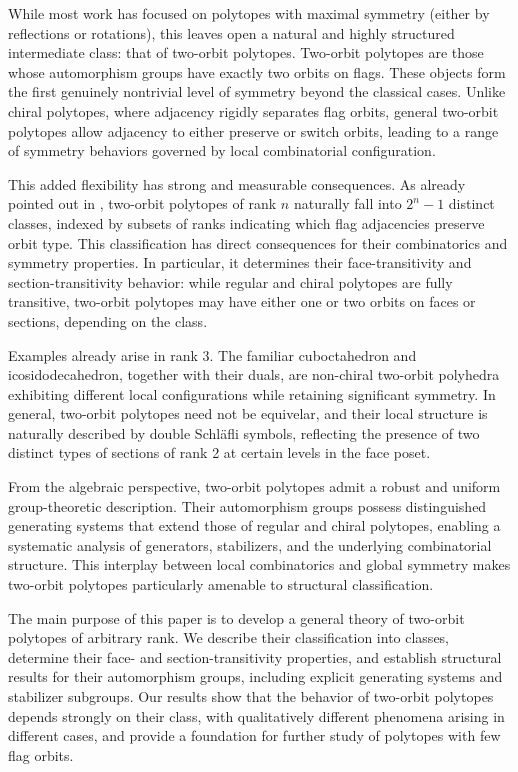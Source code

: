 \documentclass[12pt]{article}
\renewcommand{\>}{\rangle}
\theoremstyle{definition}\newtheorem{definition}{Definition}[section]
\begin{document}
While most work has focused on polytopes with maximal symmetry (either by reflections or rotations), this leaves open a natural and highly structured intermediate class: that of two-orbit polytopes.
Two-orbit polytopes are those whose automorphism groups have exactly two orbits on flags. 
These objects form the first genuinely nontrivial level of symmetry beyond the classical cases. 
Unlike chiral polytopes, where adjacency rigidly separates flag orbits, general two-orbit polytopes allow adjacency to either preserve or switch orbits, leading to a range of symmetry behaviors governed by local combinatorial configuration.

This added flexibility has strong and measurable consequences. As already pointed out in \cite{isathesis}, two-orbit polytopes of rank $n$ naturally fall into $2^n-1$ distinct classes, indexed by subsets of ranks indicating which flag adjacencies preserve orbit type. 
This classification has direct consequences for their {combinatorics and symmetry properties}. In particular, it determines their face-transitivity and section-transitivity behavior: while regular and chiral polytopes are fully transitive, two-orbit polytopes may have either one or two orbits on faces or sections, depending on the class.

Examples already arise in rank 3. The {familiar} cuboctahedron and icosidodecahedron, together with their duals, are non-chiral two-orbit polyhedra exhibiting different local configurations while retaining significant symmetry.
In general, two-orbit polytopes need not be equivelar, and their local structure is naturally described by double Schläfli symbols, reflecting the presence of two distinct types of sections {of rank 2 at certain levels in the face poset.}

From the algebraic perspective, two-orbit polytopes admit a robust and uniform group-theoretic description. Their automorphism groups possess distinguished generating systems that extend those of regular and chiral polytopes, enabling a systematic analysis of generators, stabilizers, and the underlying combinatorial structure. 
This interplay between local combinatorics and global symmetry makes two-orbit polytopes particularly amenable to structural classification.

The main purpose of this paper is to develop a general theory of two-orbit polytopes of arbitrary rank. We describe their classification into classes, determine their face- and section-transitivity properties, and establish structural results for their automorphism groups, including explicit generating systems and stabilizer subgroups. Our results show that the behavior of two-orbit polytopes depends strongly on their class, with qualitatively different phenomena arising in different cases, and provide a foundation for further study of polytopes with few flag orbits.
\end{document}
